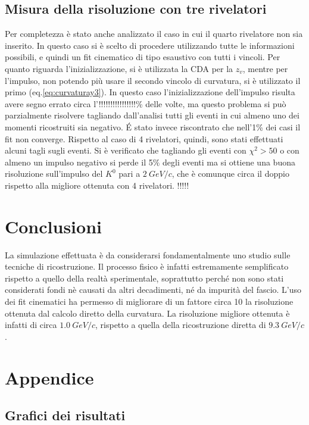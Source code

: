 \documentclass[8pt]{extarticle}
\begin{document}
\subsection{Misura della risoluzione con tre rivelatori}
Per completezza è stato anche analizzato il caso in cui il quarto rivelatore non sia inserito. In questo caso si è scelto di procedere utilizzando tutte le informazioni possibili, e quindi un fit cinematico di tipo esaustivo con tutti i vincoli. Per quanto riguarda l'inizializzazione, si è utilizzata la CDA per la $z_v$, mentre per l'impulso, non potendo più usare il secondo vincolo di curvatura, si è utilizzato il primo (eq.\ref{eq:curvaturay3}). In questo caso l'inizializzazione dell'impulso risulta avere segno errato circa l'!!!!!!!!!!!!!!!!\% delle volte, ma questo problema si può parzialmente risolvere tagliando dall'analisi tutti gli eventi in cui almeno uno dei momenti ricostruiti sia negativo. \'E stato invece riscontrato che nell'1\% dei casi il fit non converge. Rispetto al caso di 4 rivelatori, quindi, sono stati effettuati alcuni tagli sugli eventi. Si è verificato che tagliando gli eventi con $\chi^2 > 50$ o con almeno un impulso negativo si perde il 5$\%$ degli eventi ma si ottiene una buona risoluzione sull'impulso del $K^0$ pari a $2\ GeV/c$, che è comunque circa il doppio rispetto alla migliore ottenuta con 4 rivelatori. !!!!!


\section{Conclusioni} \label{sec:conclusioni}
La simulazione effettuata è da considerarsi fondamentalmente uno studio sulle tecniche di ricostruzione. Il processo fisico è infatti estremamente semplificato rispetto a quello della realtà sperimentale, soprattutto perché non sono stati considerati fondi nè causati da altri decadimenti, né da impurità del fascio. L'uso dei fit cinematici ha permesso di migliorare di un fattore circa 10 la risoluzione ottenuta dal calcolo diretto della curvatura. La risoluzione migliore ottenuta è infatti di circa $1.0\ GeV/c$, rispetto a quella della ricostruzione diretta di $9.3\ GeV/c$. 

\section{Appendice}
\subsection{Grafici dei risultati} \label{subsec:grafici}
\end{document}

